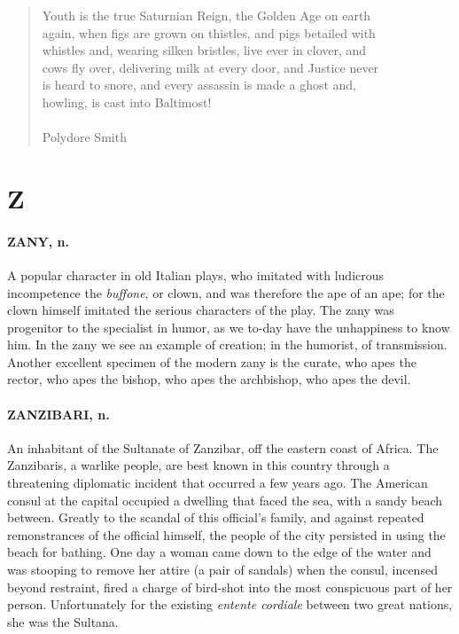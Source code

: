\documentclass[11pt]{article}
\begin{document}
\begin{quote}       Youth is the true Saturnian Reign, the Golden Age on earth \\
  again, when figs are grown on thistles, and pigs betailed with \\
  whistles and, wearing silken bristles, live ever in clover, and \\
  cows fly over, delivering milk at every door, and Justice never \\
  is heard to snore, and every assassin is made a ghost and, \\
  howling, is cast into Baltimost! \\
 \\
Polydore Smith \end{quote}




\section*{Z}



\paragraph{ZANY, n.}  A popular character in old Italian plays, who imitated with
ludicrous incompetence the {\em buffone}, or clown, and was therefore the
ape of an ape; for the clown himself imitated the serious characters
of the play.  The zany was progenitor to the specialist in humor, as
we to-day have the unhappiness to know him.  In the zany we see an
example of creation; in the humorist, of transmission.  Another
excellent specimen of the modern zany is the curate, who apes the
rector, who apes the bishop, who apes the archbishop, who apes the
devil.

\paragraph{ZANZIBARI, n.}  An inhabitant of the Sultanate of Zanzibar, off the
eastern coast of Africa.  The Zanzibaris, a warlike people, are best
known in this country through a threatening diplomatic incident that
occurred a few years ago.  The American consul at the capital occupied
a dwelling that faced the sea, with a sandy beach between.  Greatly to
the scandal of this official's family, and against repeated
remonstrances of the official himself, the people of the city
persisted in using the beach for bathing.  One day a woman came down
to the edge of the water and was stooping to remove her attire (a pair
of sandals) when the consul, incensed beyond restraint, fired a charge
of bird-shot into the most conspicuous part of her person.
Unfortunately for the existing {\em entente cordiale} between two great
nations, she was the Sultana.
\end{document}

